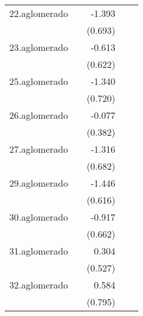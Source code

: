{\begin{longtable}{l*{4}{D{.}{.}{-1}}}
\addlinespace
22.aglomerado&                     &      -1.393\sym{*}  &                     &                     \\
            &                     &     (0.693)         &                     &                     \\
\addlinespace
23.aglomerado&                     &      -0.613         &                     &                     \\
            &                     &     (0.622)         &                     &                     \\
\addlinespace
25.aglomerado&                     &      -1.340         &                     &                     \\
            &                     &     (0.720)         &                     &                     \\
\addlinespace
26.aglomerado&                     &      -0.077         &                     &                     \\
            &                     &     (0.382)         &                     &                     \\
\addlinespace
27.aglomerado&                     &      -1.316         &                     &                     \\
            &                     &     (0.682)         &                     &                     \\
\addlinespace
29.aglomerado&                     &      -1.446\sym{*}  &                     &                     \\
            &                     &     (0.616)         &                     &                     \\
\addlinespace
30.aglomerado&                     &      -0.917         &                     &                     \\
            &                     &     (0.662)         &                     &                     \\
\addlinespace
31.aglomerado&                     &       0.304         &                     &                     \\
            &                     &     (0.527)         &                     &                     \\
\addlinespace
32.aglomerado&                     &       0.584         &                     &                     \\
            &                     &     (0.795)         &                     &                     \\

\end{longtable}}
